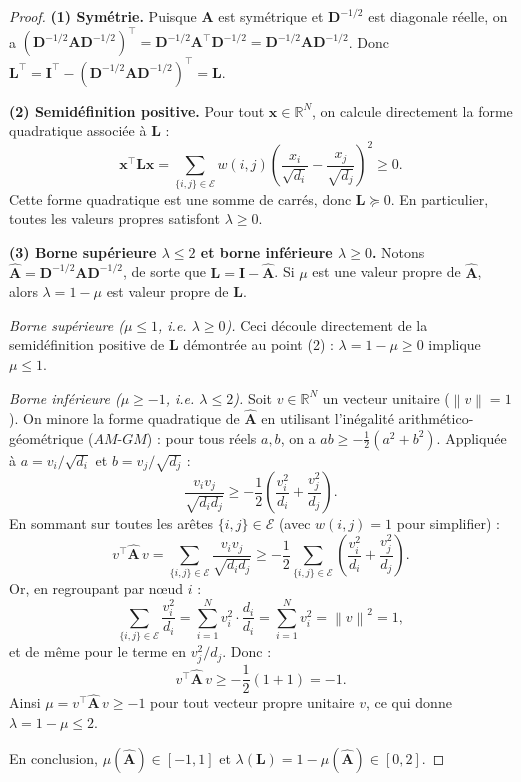 \documentclass[12pt, a4paper]{article}
\theoremstyle{definition}
\newcommand{\R}{\mathbb{R}}
\newcommand{\calE}{\mathcal{E}}
\newcommand{\mat}[1]{\mathbf{#1}}
\newcommand{\A}{\mat{A}}
\newcommand{\D}{\mat{D}}
\newcommand{\I}{\mat{I}}
\newcommand{\L}{\mat{L}}
\newcommand{\x}{\mathbf{x}}
\newcommand{\norm}[1]{\left\lVert #1 \right\rVert}
\begin{document}
\begin{proof}
\textbf{(1) Symétrie.}
Puisque $\A$ est symétrique et $\D^{-1/2}$ est diagonale réelle,
on a $(\D^{-1/2} \A \D^{-1/2})^\top = \D^{-1/2} \A^\top \D^{-1/2} = \D^{-1/2} \A \D^{-1/2}$.
Donc $\L^\top = \I^\top - (\D^{-1/2} \A \D^{-1/2})^\top = \L$.

\textbf{(2) Semidéfinition positive.}
Pour tout $\x \in \R^N$, on calcule directement la forme quadratique associée à $\L$ :
\[
  \x^\top \L \x
  = \sum_{\{i,j\} \in \calE} w(i,j)
    \left( \frac{x_i}{\sqrt{d_i}} - \frac{x_j}{\sqrt{d_j}} \right)^2 \geq 0.
\]
Cette forme quadratique est une somme de carrés, donc $\L \succeq 0$.
En particulier, toutes les valeurs propres satisfont $\lambda \geq 0$.

\textbf{(3) Borne supérieure $\lambda \leq 2$ et borne inférieure $\lambda \geq 0$.}
Notons $\hat{\A} = \D^{-1/2} \A \D^{-1/2}$, de sorte que $\L = \I - \hat{\A}$.
Si $\mu$ est une valeur propre de $\hat{\A}$, alors $\lambda = 1 - \mu$ est valeur propre
de $\L$.

\emph{Borne supérieure ($\mu \leq 1$, i.e. $\lambda \geq 0$).}
Ceci découle directement de la semidéfinition positive de $\L$ démontrée au point (2) :
$\lambda = 1 - \mu \geq 0$ implique $\mu \leq 1$.

\emph{Borne inférieure ($\mu \geq -1$, i.e. $\lambda \leq 2$).}
Soit $v \in \R^N$ un vecteur unitaire ($\norm{v} = 1$). On minore la forme quadratique
de $\hat{\A}$ en utilisant l'inégalité arithmético-géométrique ($AM$-$GM$) :
pour tous réels $a, b$, on a $ab \geq -\frac{1}{2}(a^2 + b^2)$.
Appliquée à $a = v_i / \sqrt{d_i}$ et $b = v_j / \sqrt{d_j}$ :
\[
  \frac{v_i v_j}{\sqrt{d_i d_j}} \geq -\frac{1}{2}\left(\frac{v_i^2}{d_i} + \frac{v_j^2}{d_j}\right).
\]
En sommant sur toutes les arêtes $\{i,j\} \in \calE$ (avec $w(i,j) = 1$ pour simplifier) :
\[
  v^\top \hat{\A}\, v
  = \sum_{\{i,j\} \in \calE} \frac{v_i v_j}{\sqrt{d_i d_j}}
  \geq -\frac{1}{2} \sum_{\{i,j\} \in \calE} \left(\frac{v_i^2}{d_i} + \frac{v_j^2}{d_j}\right).
\]
Or, en regroupant par nœud $i$ :
\[
  \sum_{\{i,j\} \in \calE} \frac{v_i^2}{d_i} = \sum_{i=1}^N v_i^2 \cdot \frac{d_i}{d_i} = \sum_{i=1}^N v_i^2 = \norm{v}^2 = 1,
\]
et de même pour le terme en $v_j^2 / d_j$. Donc :
\[
  v^\top \hat{\A}\, v \geq -\frac{1}{2}(1 + 1) = -1.
\]
Ainsi $\mu = v^\top \hat{\A}\, v \geq -1$ pour tout vecteur propre unitaire $v$,
ce qui donne $\lambda = 1 - \mu \leq 2$.

En conclusion, $\mu(\hat{\A}) \in [-1, 1]$ et $\lambda(\L) = 1 - \mu(\hat{\A}) \in [0, 2]$.
\end{proof}
\end{document}
